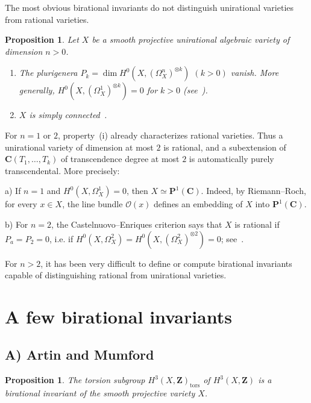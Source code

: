 \documentclass[12pt]{amsart}
\theoremstyle{plain}
\newtheorem{proposition}[theorem]{Proposition}
\theoremstyle{definition}
\theoremstyle{remark}
\begin{document}
The most obvious birational invariants do not distinguish unirational varieties
from rational varieties.

\begin{proposition}\label{prop:1.5}
Let $X$ be a smooth projective unirational algebraic variety of dimension
$n>0$.
\begin{enumerate}
\item[(i)] The plurigenera
$P_k=\dim H^0(X,(\Omega_X^n)^{\otimes k})$ $(k>0)$ vanish. More generally,
$H^0(X,(\Omega_X^1)^{\otimes k})=0$ for $k>0$ (see~\cite[Remark, p.~102]{9}).
\item[(ii)] $X$ is simply connected~\cite{10}.
\end{enumerate}
\end{proposition}

For $n=1$ or $2$, property~(i) already characterizes rational varieties. Thus a
unirational variety of dimension at most $2$ is rational, and a subextension of
$\mathbf{C}(T_1,\ldots,T_k)$ of transcendence degree at most $2$ is automatically
purely transcendental. More precisely:

\smallskip
\noindent a) If $n=1$ and $H^0(X,\Omega_X^1)=0$, then
$X\simeq \mathbf{P}^1(\mathbf{C})$. Indeed, by Riemann--Roch, for every
$x\in X$, the line bundle $\mathcal O(x)$ defines an embedding of $X$ into
$\mathbf{P}^1(\mathbf{C})$.

\smallskip
\noindent b) For $n=2$, the Castelnuovo--Enriques criterion says that $X$ is
rational if $P_a=P_2=0$, i.e.
if $H^0(X,\Omega_X^2)=H^0(X,(\Omega_X^2)^{\otimes 2})=0$; see~\cite{9}.

For $n>2$, it has been very difficult to define or compute birational invariants
capable of distinguishing rational from unirational varieties.

\section{A few birational invariants}

\subsection*{A) Artin and Mumford}

\begin{proposition}\label{prop:2.1}
The torsion subgroup $H^3(X,\mathbf{Z})_{\mathrm{tors}}$ of $H^3(X,\mathbf{Z})$
is a birational invariant of the smooth projective variety $X$.
\end{proposition}
\end{document}
